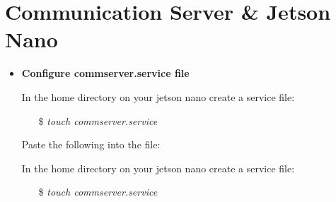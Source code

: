 \section{Communication Server \& Jetson Nano}

\begin{itemize}
\item \textbf{Configure commserver.service file}

In the home directory on your jetson nano create a service file:

\begin{itemize}
    \item[\$] \textit{touch commserver.service}
\end{itemize}

Paste the following into the file: 


In the home directory on your jetson nano create a service file:

\begin{itemize}
    \item[\$] \textit{touch commserver.service}
\end{itemize}

\end{itemize}